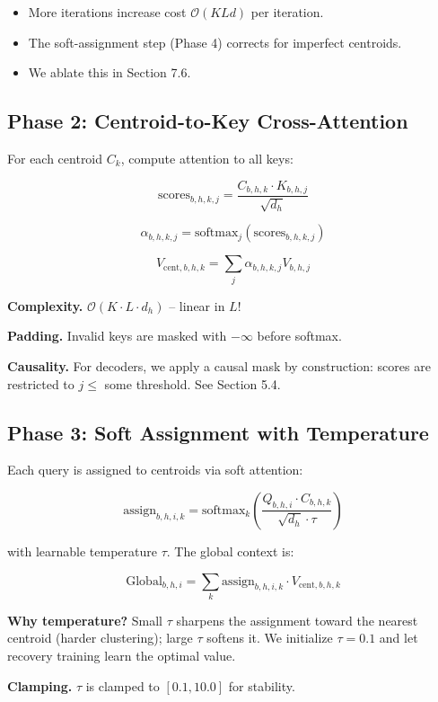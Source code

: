 \begin{itemize}
\item More iterations increase cost $\mathcal{O}(K L d)$ per iteration.
\item The soft-assignment step (Phase 4) corrects for imperfect centroids.
\item We ablate this in Section 7.6.

\end{itemize}
\subsection{Phase 2: Centroid-to-Key Cross-Attention}

For each centroid $C_k$, compute attention to all keys:

\[
\text{scores}_{b,h,k,j} = \frac{C_{b,h,k} \cdot K_{b,h,j}}{\sqrt{d_h}}
\]

\[
\alpha_{b,h,k,j} = \text{softmax}_j(\text{scores}_{b,h,k,j})
\]

\[
V_{\text{cent}, b,h,k} = \sum_j \alpha_{b,h,k,j} V_{b,h,j}
\]

\textbf{Complexity.} $\mathcal{O}(K \cdot L \cdot d_h)$ -- linear in $L$!

\textbf{Padding.} Invalid keys are masked with $-\infty$ before softmax.

\textbf{Causality.} For decoders, we apply a causal mask by construction: 
scores are restricted to $j \leq$ some threshold. See Section 5.4.

\subsection{Phase 3: Soft Assignment with Temperature}

Each query is assigned to centroids via soft attention:

\[
\text{assign}_{b,h,i,k} = \text{softmax}_k\!\left(\frac{Q_{b,h,i} \cdot C_{b,h,k}}{\sqrt{d_h} \cdot \tau}\right)
\]

with learnable temperature $\tau$. The global context is:

\[
\text{Global}_{b,h,i} = \sum_k \text{assign}_{b,h,i,k} \cdot V_{\text{cent}, b,h,k}
\]

\textbf{Why temperature?} Small $\tau$ sharpens the assignment toward the 
nearest centroid (harder clustering); large $\tau$ softens it. We initialize 
$\tau = 0.1$ and let recovery training learn the optimal value.

\textbf{Clamping.} $\tau$ is clamped to $[0.1, 10.0]$ for stability.

